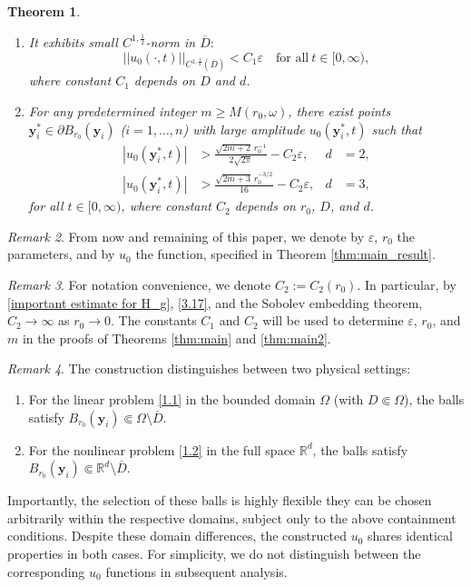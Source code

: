 \documentclass[11pt,reqno,oneside]{amsart}
\numberwithin{equation}{section}
\newtheorem{theorem}{Theorem}[section]
\theoremstyle{definition}
\theoremstyle{remark}
\newtheorem{remark}[theorem]{Remark}
\numberwithin{equation}{section}
\begin{document}
\begin{theorem}
\begin{enumerate}
			\item It exhibits small $C^{1,\frac{1}{2}}$-norm in $\overline{D}:$
			\begin{equation}\label{u0 smalles}
				||u_0(\cdot,t)||_{C^{1,\frac{1}{2}}(\overline{D})} < C_1\varepsilon \quad \text{for all}~ t \in [0,\infty),
			\end{equation}
			where constant $C_1$ depends on $D$ and $d$.
			
			\item For any predetermined integer $m \geqslant M(r_0,\omega)$, there exist points $\mathbf{y}^*_i \in \partial B_{r_0}(\mathbf{y}_i)$  ($i=1,\dots,n$) with large amplitude $u_0(\mathbf{y}^*_i,t)$ such that
			\begin{align}
				|u_0(\mathbf{y}^*_i,t)| &> \frac{\sqrt{2m+2}\,r_0^{-1}}{2\sqrt{2\pi}} - C_2\varepsilon, & d &= 2, \label{2 d} \\
				|u_0(\mathbf{y}^*_i,t)| &> \frac{\sqrt{2m+3}\,r_0^{-3/2}}{16} - C_2\varepsilon, & d &= 3, \label{3 d}
			\end{align}
			for all $t \in [0,\infty)$, where constant $C_2$ depends on $r_0$, $D$, and $d$.
		\end{enumerate}
	\end{theorem}
	
	\begin{remark}\label{cf 3.5}
		From now and remaining of this paper, we denote by $\varepsilon$, $r_0$ the parameters, and by $u_0$ the function, specified in Theorem \ref{thm:main_result}.
	\end{remark}
	
	\begin{remark}\label{remark 3.2}
		For notation convenience, we denote $C_2 := C_2(r_0)$. In particular, by \eqref{important estimate for H_g}, \eqref{3.17}, and the Sobolev embedding theorem, $C_2 \to \infty$ as $r_0 \to 0$. The constants $C_1$ and $C_2$ will be used to determine $\varepsilon$, $r_0$, and $m$ in the proofs of Theorems \ref{thm:main} and \ref{thm:main2}.
	\end{remark}
	
	\begin{remark}
		The construction distinguishes between two physical settings:
		\begin{enumerate}
			\renewcommand{\labelenumi}{(\roman{enumi})}
			\item For the linear problem \eqref{1.1} in the bounded domain $\Omega$ (with $D \Subset \Omega$), the balls satisfy $B_{r_0}(\mathbf{y}_i) \Subset \Omega \setminus \overline{D}$.
			\item For the nonlinear problem \eqref{1.2} in the full space $\mathbb{R}^d$, the balls satisfy $B_{r_0}(\mathbf{y}_i) \Subset \mathbb{R}^d \setminus \overline{D}$.
		\end{enumerate}
		Importantly, the selection of these balls is highly flexible they can be chosen arbitrarily within the respective domains, subject only to the above containment conditions. Despite these domain differences, the constructed $u_0$ shares identical properties in both cases. For simplicity, we do not distinguish between the corresponding $u_0$ functions in subsequent analysis.
	\end{remark}
	
\end{document}
